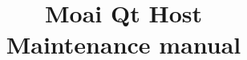 \documentclass[a4paper, 12pt]{report}
\begin{document}
\title{Moai Qt Host \\ Maintenance manual}

\maketitle

\tableofcontents












\end{document}
